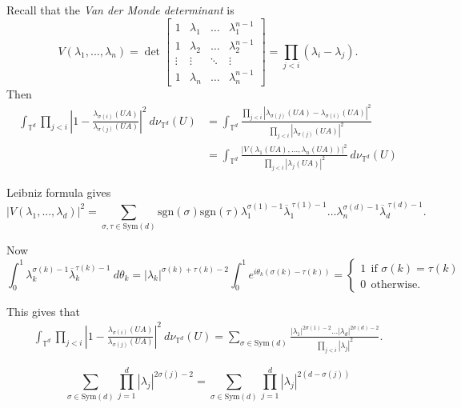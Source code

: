 \documentclass[10pt]{amsart}
\numberwithin{equation}{section}     %
\newcommand{\T}{\mathbb{T}}
\newcommand{\Sym}{\mathrm{Sym}}
\begin{document}
 Recall that the \emph{Van der Monde determinant} is $$V(\lambda_1,...,\lambda_n) = \det \begin{bmatrix}
     1 & \lambda_1 & \dots & \lambda_1^{n-1} \\ 
     1 & \lambda_2 & \dots & \lambda_2^{n-1} \\
     \vdots & \vdots& \ddots&\vdots \\
     1 & \lambda_n & \dots & \lambda_n^{n-1} 
 \end{bmatrix} = \prod \limits_{j<i} (\lambda_i - \lambda_j). $$ Then \begin{align*}
     \int_{\T^d}  \prod \limits_{j < i} \left| 1 - \frac{\lambda_{\sigma(i)}(UA)}{\lambda_{\sigma(j)}(UA)} \right|^{2} \ d\nu_{\T^d}(U) 
     &= \int_{\T^d}  \frac{\prod \limits_{j < i}|\lambda_{\sigma(j)} (UA) - \lambda_{\sigma(i)}(UA)|^2}{\prod \limits_{j < i}|\lambda_{\sigma(j)}(UA)|^2}  \\
     &= \int_{\T^d} \frac{|V(\lambda_1(UA),...,\lambda_n(UA))|^2}{\prod \limits_{j < i} |\lambda_j(UA)|^2} \ d\nu_{\T^d}(U)
 \end{align*} 

Leibniz formula gives 
$$|V(\lambda_1,...,\lambda_d)|^2 = \sum \limits_{\sigma, \tau \in \Sym(d)} \mathrm{sgn}(\sigma)\mathrm{sgn}(\tau) \lambda_1^{\sigma(1) - 1} \overline{\lambda}_1^{ \ \tau(1)-1} \dots \lambda_n^{\sigma(d)-1} \overline{\lambda}_d^{\ \tau(d)-1}.$$

Now $$\int_{0}^1 \lambda_k^{\sigma(k)-1} \overline{\lambda}_k^{\tau(k)-1} \ d\theta_k = |\lambda_k|^{\sigma(k) + \tau(k) - 2} \int_0^{1} e^{i\theta_k(\sigma(k) - \tau(k))} = \begin{cases}
    1 \ \ \text{if } \sigma(k) = \tau(k) \\
    0 \ \ \text{otherwise}.
\end{cases}$$

This gives that \begin{align*}
    \int_{\T^d}  \prod \limits_{j < i} \left| 1 - \frac{\lambda_{\sigma(i)}(UA)}{\lambda_{\sigma(j)}(UA)} \right|^{2} \ d\nu_{\T^d}(U)  = \sum \limits_{\sigma \in \Sym(d)} \frac{|\lambda_1|^{2\sigma(1) - 2} \dots |\lambda_d|^{2\sigma(d) - 2}}{\prod \limits_{j<i} |\lambda_j|^2}. 
\end{align*}

\begin{lemma}
    $$\sum \limits_{\sigma \in \Sym(d)}  \prod \limits_{j=1}^d |\lambda_j|^{2\sigma(j) - 2}=  \sum \limits_{\sigma \in \Sym(d)} \prod \limits_{j=1}^d |\lambda_j|^{2(d-\sigma(j))}$$
\end{lemma}
\end{document}
